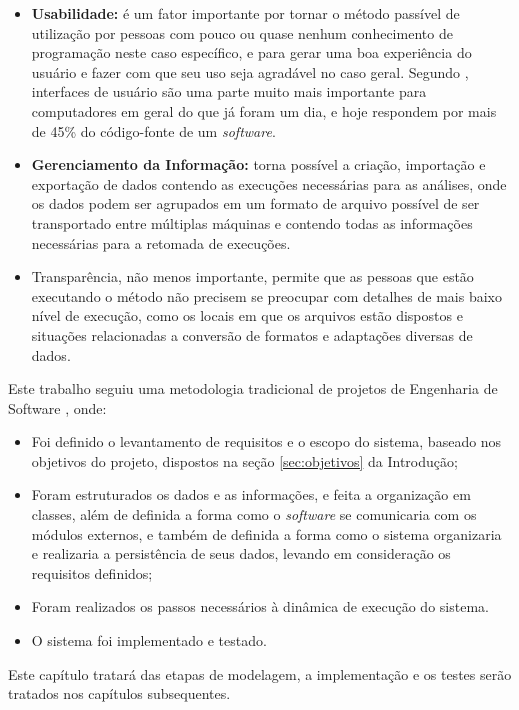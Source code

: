 \begin{itemize}
 \item{\textbf{Usabilidade:} é um fator importante por tornar o método passível de utilização por pessoas com pouco ou quase nenhum conhecimento de
programação neste caso específico, e para gerar uma boa experiência do usuário e fazer com que seu uso seja agradável no caso geral. Segundo
\cite{nielsen1993}, interfaces de usuário são uma parte muito mais importante para computadores em geral do que já foram um dia, e hoje respondem por mais
de 45\% do código-fonte de um \textit{software}.}
  \item{\textbf{Gerenciamento da Informação:} torna possível a criação, importação e exportação de dados contendo as execuções necessárias para as análises,
onde os dados podem ser agrupados em um formato de arquivo possível de ser transportado entre múltiplas máquinas e contendo todas as informações
necessárias para a retomada de execuções.}
  \item{Transparência, não menos importante, permite que as pessoas que estão executando o método não precisem se
preocupar com detalhes de mais baixo nível de execução, como os locais em que os arquivos estão dispostos e situações relacionadas a conversão de
formatos e adaptações diversas de dados.}
\end{itemize}

Este trabalho seguiu uma metodologia tradicional de projetos de Engenharia de Software \cite{softeng2005}, onde:

\begin{itemize}
  \item{Foi definido o levantamento de requisitos e o escopo do sistema, baseado nos objetivos do projeto,
dispostos na seção \ref{sec:objetivos} da Introdução;}
  \item{Foram estruturados os dados e as informações, e feita a organização em classes, além de definida a forma como o \textit{software}
se comunicaria com os módulos externos, e também de definida a forma como o sistema organizaria e realizaria a persistência de seus dados, levando
em consideração os requisitos definidos;}
  \item{Foram realizados os passos necessários à dinâmica de execução do sistema. }
  \item{O sistema foi implementado e testado.}
\end{itemize}

Este capítulo tratará das etapas de modelagem, a implementação e os testes serão tratados nos capítulos subsequentes.

